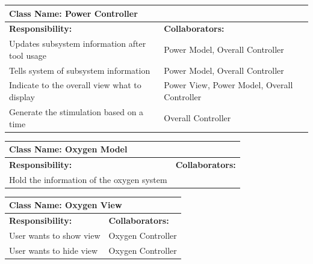 \documentclass[12pt, titlepage]{article}
\begin{document}
\begin{enumerate}[a)]
	\begin{table}[H]
		\centering
		\begin{tabular}{|p{5cm}|p{5cm}|}
		\hline 
		 \multicolumn{2}{|l|}{\textbf{Class Name: Power Controller}} \\
		\hline
		\textbf{Responsibility:} & \textbf{Collaborators:} \\
		\hline
		Updates subsystem information after tool usage & Power Model, Overall Controller\\
		\hline
		 Tells system of subsystem information & Power Model, Overall Controller\\
		\hline
		 Indicate to the overall view what to display & Power View, Power Model, Overall Controller\\
		\hline
		 Generate the stimulation based on a time & Overall Controller \\
		\hline
		\end{tabular}
	\end{table}

	\begin{table}[H]
		\centering
		\begin{tabular}{|p{5cm}|p{5cm}|}
		\hline 
		 \multicolumn{2}{|l|}{\textbf{Class Name: Oxygen Model}} \\
		\hline
		\textbf{Responsibility:} & \textbf{Collaborators:} \\
		\hline
		 Hold the information of the oxygen system & \\
		\hline
		\end{tabular}
	\end{table}

	\begin{table}[H]
		\centering
		\begin{tabular}{|p{5cm}|p{5cm}|}
		\hline 
		 \multicolumn{2}{|l|}{\textbf{Class Name: Oxygen View}} \\
		\hline
		\textbf{Responsibility:} & \textbf{Collaborators:} \\
		\hline
		 User wants to show view & Oxygen Controller\\
		\hline
		User wants to hide view & Oxygen Controller\\
		\hline
		\end{tabular}
	\end{table}


\end{enumerate}
\end{document}
